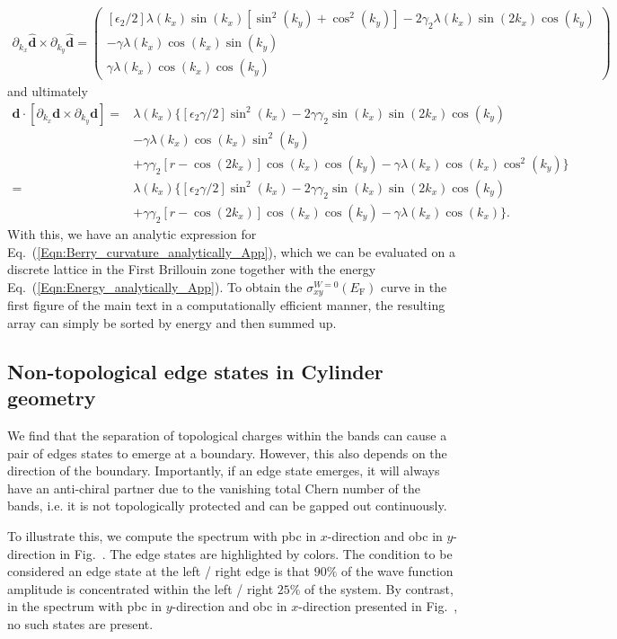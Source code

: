 \documentclass[aps,prb,amsmath,amssymb,twocolumn, superscriptaddress]{revtex4-2}
\newcommand{\eq}[1]{Eq.~(\ref{#1})}
\begin{document}
\begin{align}
\partial_{k_x} \bm {\hat  d} \times \partial_{k_y} \bm {\hat  d} = 
\begin{pmatrix}
[\epsilon_2 / 2] \lambda(k_x) \sin(k_x)[\sin^2(k_y) + \cos^2(k_y)] - 2 \gamma_2 \lambda(k_x) \sin(2k_x) \cos(k_y) \\
- \gamma \lambda(k_x) \cos(k_x) \sin(k_y) \\
\gamma \lambda(k_x) \cos(k_x) \cos(k_y)
\end{pmatrix}
\end{align}
and ultimately
\begin{align}
\bm {d} \cdot [\partial_{k_x} \bm {d} \times \partial_{k_y} \bm {d}] =& \lambda(k_x) \{ [\epsilon_2 \gamma / 2] \sin^2(k_x) - 2 \gamma \gamma_2 \sin(k_x) \sin(2k_x) \cos(k_y)\nonumber  \\
&- \gamma \lambda(k_x) \cos(k_x) \sin^2(k_y) \nonumber\\
&+ \gamma \gamma_2 [r - \cos(2 k_x)] \cos(k_x) \cos(k_y) -  \gamma \lambda(k_x) \cos(k_x) \cos^2(k_y)\} \nonumber\\
=& \lambda(k_x) \{[\epsilon_2 \gamma / 2] \sin^2(k_x) - 2 \gamma \gamma_2 \sin(k_x) \sin(2k_x) \cos(k_y)  \nonumber \\
&+ \gamma \gamma_2 [r - \cos(2 k_x)] \cos(k_x) \cos(k_y) - \gamma \lambda(k_x) \cos(k_x) \}.
\end{align}
With this, we have an analytic expression for \eq{Eqn:Berry_curvature_analytically_App}, which we can be evaluated on a discrete lattice in the First Brillouin zone together with the energy \eq{Eqn:Energy_analytically_App}. To obtain the $\sigma_{xy}^{W=0}(E_\mathrm{F})$ curve in the first figure of the main text in a computationally efficient manner, the resulting array can simply be sorted by energy and then summed up.

\subsection{Non-topological edge states in Cylinder geometry}
We find that the separation of topological charges within the bands can cause a pair of edges states to emerge at a boundary. However, this also depends on the direction of the boundary. Importantly, if an edge state emerges, it will always have an anti-chiral partner due to the vanishing total Chern number of the bands, i.e. it is not topologically protected and can be gapped out continuously. 

To illustrate this, we compute the spectrum with \gls{pbc} in $x$-direction and \gls{obc} in $y$-direction in Fig.~. The edge states are highlighted by colors. The condition to be considered an edge state at the left / right edge is that $90\%$ of the wave function amplitude is concentrated within the left / right $25\%$ of the system. By contrast, in the spectrum with 
\gls{pbc} in $y$-direction and \gls{obc} in $x$-direction presented in 
Fig.~, no such states are present.
\end{document}
